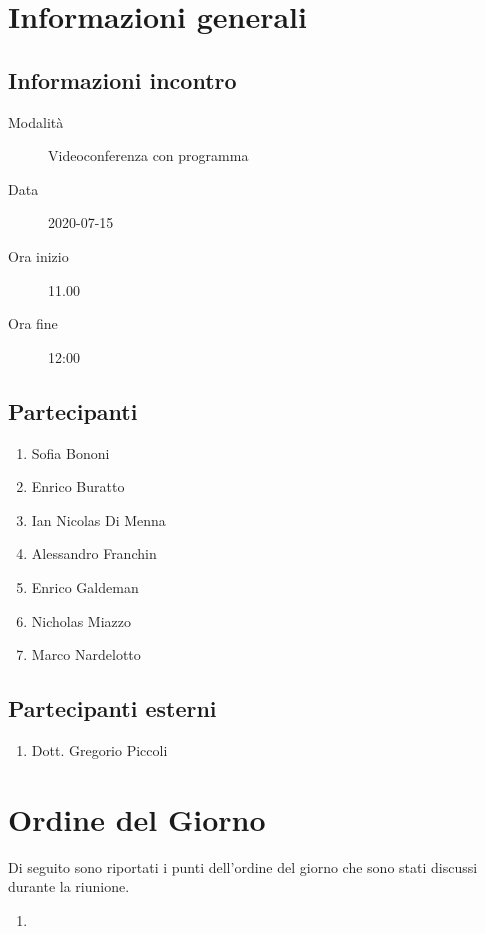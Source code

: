 \documentclass{article}
\begin{document}


\section{Informazioni generali}%
\label{sec:informazioni_generali}

\subsection{Informazioni incontro}%
\label{sub:informazioni_incontro}

\begin{description}
  \item[Modalità] Videoconferenza con programma 
  \item[Data] 2020-07-15
  \item[Ora inizio] 11.00
  \item[Ora fine] 12:00
\end{description}

\subsection{Partecipanti}%
\label{sub:partecipanti}

\begin{enumerate}
  \item Sofia Bononi
  \item Enrico Buratto
  \item Ian Nicolas Di Menna
  \item Alessandro Franchin
  \item Enrico Galdeman
  \item Nicholas Miazzo
  \item Marco Nardelotto
\end{enumerate}

\subsection{Partecipanti esterni}%
\label{sub:partecipanti esterni}

\begin{enumerate}
    \item Dott. Gregorio Piccoli
\end{enumerate}


\section{Ordine del Giorno}%
\label{ordine_del_giorno}
Di seguito sono riportati i punti dell'ordine del giorno che sono stati discussi durante la riunione.
\begin{enumerate}
  \item 
\end{enumerate}
\end{document}
